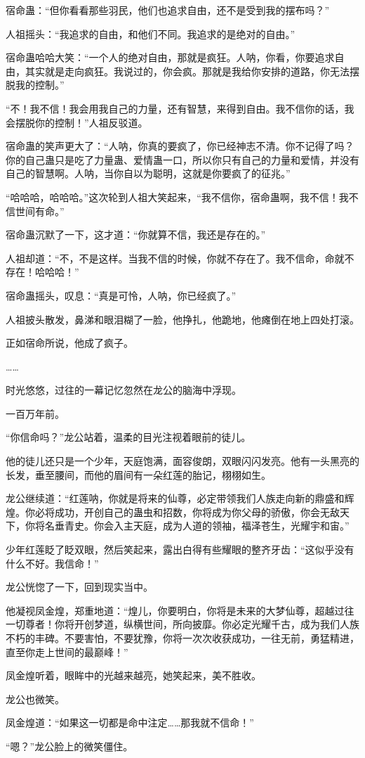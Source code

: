 \begin{this_body}
宿命蛊：“但你看看那些羽民，他们也追求自由，还不是受到我的摆布吗？”

人祖摇头：“我追求的自由，和他们不同。我追求的是绝对的自由。”

宿命蛊哈哈大笑：“一个人的绝对自由，那就是疯狂。人呐，你看，你要追求自由，其实就是走向疯狂。我说过的，你会疯。那就是我给你安排的道路，你无法摆脱我的控制。”

“不！我不信！我会用我自己的力量，还有智慧，来得到自由。我不信你的话，我会摆脱你的控制！”人祖反驳道。

宿命蛊的笑声更大了：“人呐，你真的要疯了，你已经神志不清。你不记得了吗？你的自己蛊只是吃了力量蛊、爱情蛊一口，所以你只有自己的力量和爱情，并没有自己的智慧啊。人呐，当你自以为聪明，这就是你要疯了的征兆。”

“哈哈哈，哈哈哈。”这次轮到人祖大笑起来，“我不信你，宿命蛊啊，我不信！我不信世间有命。”

宿命蛊沉默了一下，这才道：“你就算不信，我还是存在的。”

人祖却道：“不，不是这样。当我不信的时候，你就不存在了。我不信命，命就不存在！哈哈哈！”

宿命蛊摇头，叹息：“真是可怜，人呐，你已经疯了。”

人祖披头散发，鼻涕和眼泪糊了一脸，他挣扎，他跪地，他瘫倒在地上四处打滚。

正如宿命所说，他成了疯子。

……

时光悠悠，过往的一幕记忆忽然在龙公的脑海中浮现。

一百万年前。

“你信命吗？”龙公站着，温柔的目光注视着眼前的徒儿。

他的徒儿还只是一个少年，天庭饱满，面容俊朗，双眼闪闪发亮。他有一头黑亮的长发，垂至腰间，而他的眉间有一朵红莲的胎记，栩栩如生。

龙公继续道：“红莲呐，你就是将来的仙尊，必定带领我们人族走向新的鼎盛和辉煌。你必将成功，开创自己的蛊虫和招数，你将成为你父母的骄傲，你会无敌天下，你将名垂青史。你会入主天庭，成为人道的领袖，福泽苍生，光耀宇和宙。”

少年红莲眨了眨双眼，然后笑起来，露出白得有些耀眼的整齐牙齿：“这似乎没有什么不好。我信命！”

龙公恍惚了一下，回到现实当中。

他凝视凤金煌，郑重地道：“煌儿，你要明白，你将是未来的大梦仙尊，超越过往一切尊者！你将开创梦道，纵横世间，所向披靡。你必定光耀千古，成为我们人族不朽的丰碑。不要害怕，不要犹豫，你将一次次收获成功，一往无前，勇猛精进，直至你走上世间的最巅峰！”

凤金煌听着，眼眸中的光越来越亮，她笑起来，美不胜收。

龙公也微笑。

凤金煌道：“如果这一切都是命中注定……那我就不信命！”

“嗯？”龙公脸上的微笑僵住。

\end{this_body}

